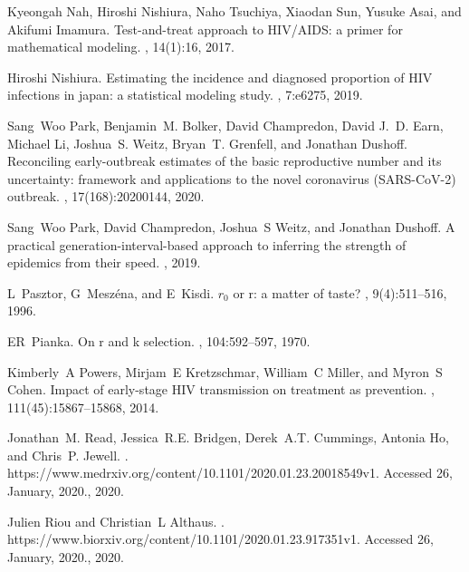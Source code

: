 \documentclass[12pt]{article}
\begin{document}
\begin{thebibliography}{10}
Kyeongah Nah, Hiroshi Nishiura, Naho Tsuchiya, Xiaodan Sun, Yusuke Asai, and
  Akifumi Imamura.
\newblock Test-and-treat approach to {HIV/AIDS}: a primer for mathematical
  modeling.
, 14(1):16, 2017.

Hiroshi Nishiura.
\newblock Estimating the incidence and diagnosed proportion of {HIV} infections
  in japan: a statistical modeling study.
, 7:e6275, 2019.

Sang~Woo Park, Benjamin~M. Bolker, David Champredon, David J.~D. Earn, Michael
  Li, Joshua~S. Weitz, Bryan~T. Grenfell, and Jonathan Dushoff.
\newblock Reconciling early-outbreak estimates of the basic reproductive number
  and its uncertainty: framework and applications to the novel coronavirus
  {(SARS-CoV-2}) outbreak.
, 17(168):20200144, 2020.

Sang~Woo Park, David Champredon, Joshua~S Weitz, and Jonathan Dushoff.
\newblock A practical generation-interval-based approach to inferring the
  strength of epidemics from their speed.
, 2019.

L~Pasztor, G~Mesz{\'e}na, and E~Kisdi.
\newblock $r_0$ or r: a matter of taste?
, 9(4):511--516, 1996.

ER~Pianka.
\newblock On r and k selection.
, 104:592--597, 1970.

Kimberly~A Powers, Mirjam~E Kretzschmar, William~C Miller, and Myron~S Cohen.
\newblock Impact of early-stage {HIV} transmission on treatment as prevention.
,
  111(45):15867--15868, 2014.

Jonathan~M. Read, Jessica~R.E. Bridgen, Derek~A.T. Cummings, Antonia Ho, and
  Chris~P. Jewell.
.
\newblock https://www.medrxiv.org/content/10.1101/2020.01.23.20018549v1.
  Accessed 26, January, 2020., 2020.

Julien Riou and Christian~L Althaus.
.
\newblock https://www.biorxiv.org/content/10.1101/2020.01.23.917351v1. Accessed
  26, January, 2020., 2020.


\end{thebibliography}
\end{document}
